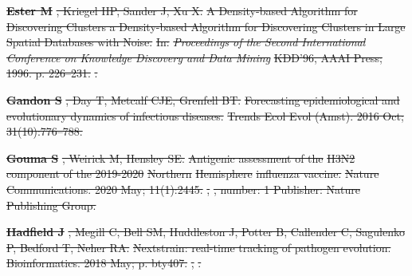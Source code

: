 \documentclass[9pt,lineno]{elife} %
\providecommand{\DIFdel}[1]{{\protect\color{red}\sout{#1}}}                      %
\providecommand{\DIFdeltex}[1]{{\protect\color{red}\sout{#1}}}                      %
\providecommand{\DIFdel}[1]{\texorpdfstring{\DIFdeltex{#1}}{}} %
\begin{document}
\textbf{%
\DIFdel{Ester M}}%
\DIFdel{, Kriegel HP, Sander J, Xu X.
}%
\DIFdel{A Density-based Algorithm for Discovering Clusters a Density-based
  Algorithm for Discovering Clusters in Large Spatial Databases with Noise.
}%
\DIFdel{In: }\emph{\DIFdel{Proceedings of the Second International Conference on
  Knowledge Discovery and Data Mining}} %
\DIFdel{KDD'96, AAAI Press; 1996. p. 226--231.
}%
\DIFdel{.
}%

\textbf{%
\DIFdel{Gandon S}}%
\DIFdel{, Day T, Metcalf CJE, Grenfell BT.
}%
\DIFdel{Forecasting epidemiological and evolutionary dynamics of infectious
  diseases.}%
\DIFdel{Trends Ecol Evol (Amst).  2016 Oct; 31(10):776--788.
}%

\textbf{%
\DIFdel{Gouma S}}%
\DIFdel{, Weirick M, Hensley SE.
}%
\DIFdel{Antigenic assessment of the }%
\DIFdel{H3N2}%
\DIFdel{component of the 2019-2020
  }%
\DIFdel{Northern}%
\DIFdel{Hemisphere}%
\DIFdel{influenza vaccine.
}%
\DIFdel{Nature Communications.  2020 May; 11(1):2445.
}%
\DIFdel{,
  }%
\DIFdel{, number: 1 Publisher: Nature
  Publishing Group.
}%

\textbf{%
\DIFdel{Hadfield J}}%
\DIFdel{, Megill C, Bell SM, Huddleston J,
  Potter B, Callender C, Sagulenko P, Bedford T, Neher RA.
}%
\DIFdel{Nextstrain: real-time tracking of pathogen evolution.
}%
\DIFdel{Bioinformatics.  2018 May; p. bty407.
}%
\DIFdel{,
  }%
\DIFdel{.
}%
\end{document}
